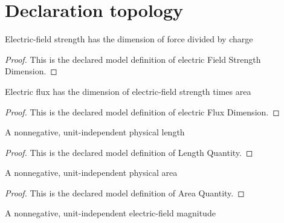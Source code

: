 \section{Declaration topology}
\begin{definition}
  \label{def:physics:phyx-mini-0845:phyxminiproblems-problemphyxmini0845-electricfieldstrengthdimension}
  Electric-field strength has the dimension of force divided by charge
\end{definition}
\begin{proof}
  This is the declared model definition of electric Field Strength Dimension.
\end{proof}
\begin{definition}
  \label{def:physics:phyx-mini-0845:phyxminiproblems-problemphyxmini0845-electricfluxdimension}
  Electric flux has the dimension of electric-field strength times area
\end{definition}
\begin{proof}
  This is the declared model definition of electric Flux Dimension.
\end{proof}
\begin{definition}
  \label{def:physics:phyx-mini-0845:phyxminiproblems-problemphyxmini0845-lengthquantity}
  A nonnegative, unit-independent physical length
\end{definition}
\begin{proof}
  This is the declared model definition of Length Quantity.
\end{proof}
\begin{definition}
  \label{def:physics:phyx-mini-0845:phyxminiproblems-problemphyxmini0845-areaquantity}
  A nonnegative, unit-independent physical area
\end{definition}
\begin{proof}
  This is the declared model definition of Area Quantity.
\end{proof}
\begin{definition}
  \label{def:physics:phyx-mini-0845:phyxminiproblems-problemphyxmini0845-electricfieldstrengthquantity}
  A nonnegative, unit-independent electric-field magnitude
\end{definition}
